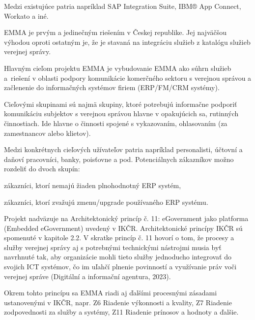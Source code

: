 Medzi existujúce  patria napríklad SAP Integration Suite, IBM® App Connect, Workato a iné.

EMMA je prvým a jedinečným riešením v Českej republike. Jej najväčšou výhodou oproti ostatným je, že je stavaná na integráciu služieb z katalógu služieb verejnej správy.

Hlavným cieľom projektu EMMA je vybudovanie EMMA ako súhrn služieb a~riešení v oblasti podpory komunikácie komerčného sektoru s verejnou správou a začlenenie do informačných systémov firiem (ERP/FM/CRM systémy).

Cieľovými skupinami sú najmä skupiny, ktoré potrebujú informačne podporiť komunikáciu subjektov s verejnou správou hlavne v opakujúcich sa, rutinných činnostiach.  Ide hlavne o činnosti spojené s vykazovaním, ohlasovaním (za zamestnancov alebo klietov). 


\blank
Medzi konkrétnych cieľových užívateľov patria napríklad personalisti, účtovní a daňoví pracovníci, banky, poisťovne a pod. Potenciálnych zákazníkov možno rozdeliť do dvoch skupín: 

\startitemize[a]
\item{zákazníci, ktorí nemajú žiaden plnohodnotný ERP systém,}
\item{zákazníci, ktorí zvažujú zmenu/upgrade používaného ERP systému.}
\stopitemize

Projekt nadväzuje na Architektonický princíp č. 11: eGovernment jako platforma (Embedded eGovernment) uvedený v IKČR. Architektonické princípy IKČR sú spomenuté v kapitole 2.2. V skratke princíp č. 11 hovorí o tom, že procesy a služby verejnej správy aj s potrebnými technickými nástrojmi musia byť navrhnuté tak, aby organizácie mohli tieto služby jednoducho integrovať do svojich ICT systémov, čo im uľahčí plnenie povinností a využívanie práv voči verejnej správe \scr(Digitální a informační agentura, 2023).

Okrem tohto princípu sa EMMA riadi aj ďalšími procesnými zásadami ustanovenými v IKČR, napr. Z6 Riadenie výkonnosti a kvality, Z7 Riadenie zodpovednosti za služby a systémy, Z11 Riadenie prínosov a hodnoty a ďalšie.

